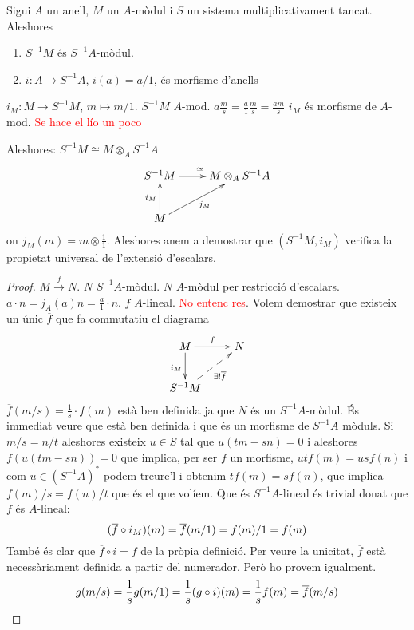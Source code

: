 \documentclass[../main.tex]{subfiles}
\begin{document}
\begin{prop}
Sigui $A$ un anell, $M$ un $A$-mòdul i $S$ un sistema multiplicativament tancat. Aleshores
\begin{enumerate}[(1)]
    \item $S^{-1}M$ és $S^{-1}A$-mòdul.
    \item $i:A\to S^{-1}A$, $i(a) = a/1$, és morfisme d'anells
\end{enumerate}
\end{prop}


\begin{prop}
$i_M:M\to S^{-1}M$, $m\mapsto m/1$. $S^{-1}M$ $A$-mod. $a\frac{m}{s} = \frac{a}{1}\frac{m}{s} = \frac{am}{s}$ $i_M$ és morfisme de $A$-mod. \textcolor{red}{Se hace el lío un poco}
\end{prop}

Aleshores: $S^{-1}M\cong M\otimes_AS^{-1}A$
\begin{equation}
    \notag
    \xymatrix{
    S^{-1}M\ar[r]^\cong & M\otimes_AS^{-1}A\\
    M\ar[u]^{i_M} \ar[ur]_{j_M} & 
    }
\end{equation}
on $j_M(m) = m\otimes \frac{1}{1}$. Aleshores anem a demostrar que $(S^{-1}M,i_M)$ verifica la propietat universal de l'extensió d'escalars.

\begin{proof}
$M\overset{f}{\to}N$. $N$ $S^{-1}A$-mòdul. $N$ $A$-mòdul per restricció d'escalars. $a\cdotp n = j_A(a)n = \frac{a}{1}\cdotp n$. $f$ $A$-lineal. \textcolor{red}{No entenc res}. Volem demostrar que existeix un únic $\overline{f}$ que fa commutatiu el diagrama
\begin{equation}
    \notag
    \xymatrix{
    M\ar[r]^f\ar[d]_{i_M} & N\\
    S^{-1}M\ar@{-->}[ur]_{\exists!\overline{f}}
    }
\end{equation}
$\overline{f}(m/s) = \frac{1}{s}\cdotp f(m)$ està ben definida ja que $N$ és un $S^{-1}A$-mòdul. És immediat veure que està ben definida i que és un morfisme de $S^{-1}A$ mòduls. Si $m/s = n/t$ aleshores existeix $u\in S$ tal que $u(tm-sn) = 0$ i aleshores $f(u(tm-sn)) = 0$ que implica, per ser $f$ un morfisme, $utf(m) = usf(n)$ i com $u\in (S^{-1}A)^*$ podem treure'l i obtenim $tf(m) = sf(n)$, que implica $f(m)/s = f(n)/t$ que és el que volíem. Que és $S^{-1}A$-lineal és trivial donat que $f$ és $A$-lineal:
\begin{equation}
    \notag
    (\overline{f}\circ i_M)(m) = \overline{f}(m/1) = f(m)/1 = f(m)
\end{equation}
També és clar que $\overline{f}\circ i = f$ de la pròpia definició. Per veure la unicitat, $\overline{f}$ està necessàriament definida a partir del numerador. Però ho provem igualment. 
\begin{equation}
    \notag
    g(m/s) = \frac{1}{s}g(m/1) = \frac{1}{s}(g\circ i)(m) = \frac{1}{s}f(m) = \overline{f}(m/s)
\end{equation}
\end{proof}
\end{document}
